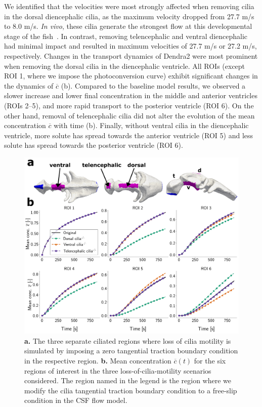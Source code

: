 \documentclass[fleqn]{wlscirep}
\newcommand{\cbar}{\overline{c}}
\begin{document}
We identified that the velocities were most strongly
affected when removing cilia in the dorsal diencephalic cilia,
as the maximum velocity dropped from 27.7 \textmu m/s to 8.0 \textmu m/s.
\emph{In vivo}, these cilia generate the strongest flow at
this developmental stage of the fish~\cite{Olstad2019CiliaryDevelopment}.
In contrast, removing telencephalic and ventral diencephalic had minimal
impact and resulted in maximum velocities of 27.7 \textmu m/s or 27.2 \textmu m/s, respectively.
Changes in the transport dynamics of Dendra2 were most prominent when removing the dorsal cilia
in the diencephalic ventricle. All ROIs (except ROI 1, where we impose the photoconversion curve)
exhibit significant changes in the dynamics of $\cbar$
(b).
Compared to the baseline model results, we observed a slower increase and lower final concentration
in the middle and anterior ventricles (ROIs 2--5),
and more rapid transport to the posterior ventricle (ROI 6).
On the other hand, removal of telencephalic cilia did not alter the evolution of the
mean concentration $\cbar$ with time (b).
Finally, without ventral cilia in the diencephalic ventricle,
more solute has spread towards the anterior ventricle (ROI 5) and
less solute has spread towards the posterior ventricle (ROI 6).
\begin{figure}[H]
    \centering
    \includegraphics[width=\textwidth]{graphics/figure5_compare_cilia_modifications.png}
    \caption{\textbf{a.} The three separate ciliated regions where loss of cilia motility is simulated
    by imposing a zero tangential traction boundary condition in the respective region.
    \textbf{b.} Mean concentration $\cbar(t)$ for the six regions of interest in the three 
    loss-of-cilia-motility scenarios considered. The region named in the legend is the region
    where we modify the cilia tangential traction boundary condition to a free-slip condition
    in the CSF flow model.}
    \label{fig:figure5_compare_cilia_modifications}
\end{figure}
\end{document}
